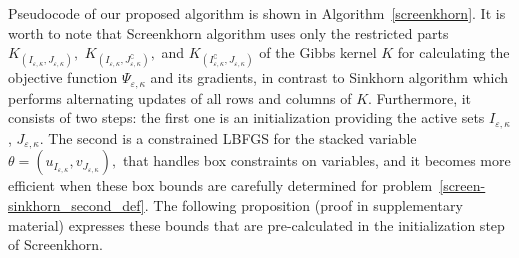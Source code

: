 Pseudocode of our proposed algorithm is shown in Algorithm~\ref{screenkhorn}. %
It is worth to note that Screenkhorn algorithm uses only the restricted parts $K_{(I_{\varepsilon,\kappa}, J_{\varepsilon,\kappa})},$ $K_{(I_{\varepsilon,\kappa}, J^\complement_{\varepsilon,\kappa})},$ and $K_{(I^\complement_{\varepsilon,\kappa}, J_{\varepsilon,\kappa})}$ of the Gibbs kernel $K$ for calculating the objective function $\Psi_{\varepsilon, \kappa}$ and its gradients, in contrast to Sinkhorn algorithm which performs alternating updates of all rows and columns of $K.$
Furthermore, it consists of two steps: the first one is an initialization providing the active sets $I_{\varepsilon,\kappa}$, $J_{\varepsilon,\kappa}$. 
The second is a constrained LBFGS for the stacked variable $\theta=(u_{I_{\varepsilon,\kappa}},v_{J_{\varepsilon,\kappa}}),$ 
that handles box constraints on variables, and it becomes more efficient when these box bounds are carefully determined for problem~\eqref{screen-sinkhorn_second_def}. 
The following proposition (proof in supplementary material) expresses these bounds that are pre-calculated in the initialization step of Screenkhorn.

